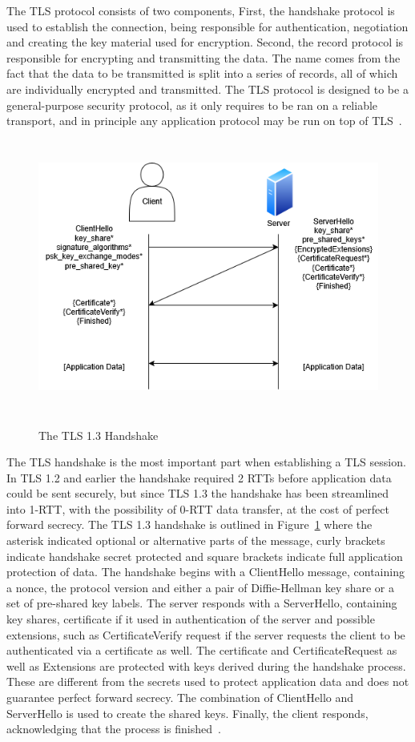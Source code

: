 \documentclass[english, 12pt, a4paper, elec, utf8, a-2b, online]{aaltothesis}
\begin{document}
The TLS protocol consists of two components, First, the handshake protocol is used to
establish the connection, being responsible for authentication, negotiation and creating
the key material used for encryption. Second, the record protocol is responsible
for encrypting and transmitting the data. The name comes from the fact that the data
to be transmitted is split into a series of records, all of which are individually
encrypted and transmitted. The TLS protocol is designed to be a general-purpose
security protocol, as it only requires to be ran on a reliable transport, and in
principle any application protocol may be run on top of TLS~\cite{rfc8446}.

\begin{figure}[h]
	\centering
	\includegraphics[alt={Diagram of TLS handshake between a client and a server}, height=9cm]{./images/tls_handshake.png}
	\caption{The TLS 1.3 Handshake}
	\label{fig:tls_handshake}
\end{figure}
The TLS handshake is the most important part when establishing a TLS session. In
TLS 1.2 and earlier the handshake required 2 RTTs before application data could be sent
securely, but since TLS 1.3 the handshake has been streamlined into 1-RTT, with the
possibility of 0-RTT data transfer, at the cost of perfect forward secrecy. The TLS 1.3
handshake is outlined in Figure~\ref{fig:tls_handshake} where the asterisk indicated optional
or alternative parts of the message, curly brackets indicate handshake secret protected and
square brackets indicate full application protection of data. The handshake begins with a ClientHello message,
containing a nonce, the protocol version and
either a pair of Diffie-Hellman key share or a set of pre-shared key labels. The server responds
with a ServerHello, containing key shares, certificate if it used in authentication of the server
and possible extensions, such as CertificateVerify request if the server requests the client
to be authenticated via a certificate as well. The certificate and CertificateRequest as
well as Extensions are protected with keys derived during the handshake process. These
are different from the secrets used to protect application data and does not guarantee
perfect forward secrecy. The combination of ClientHello and ServerHello is used to
create the shared keys. Finally, the client responds, acknowledging that the process is finished~\cite{rfc8446}.
\end{document}
